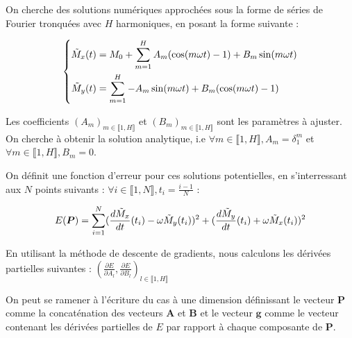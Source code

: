 \documentclass[12pt]{report}
\begin{document}
On cherche des solutions numériques approchées sous la forme de séries de Fourier tronquées avec $H$ harmoniques, en posant la forme suivante :

\begin{equation}
    \left\{
    \begin{aligned}
        \Tilde{M}_x(t) & = M_0 + \sum_{m=1}^{H} A_m (\cos(m\omega t)-1) + B_m \sin(m\omega t) \\
        \Tilde{M}_y(t) & = \sum_{m=1}^{H} -A_m \sin(m\omega t) + B_m (\cos(m\omega t)-1)
    \end{aligned}
    \right.
    \label{eq:solution_fourier_couplee_2D}
\end{equation}

Les coefficients $(A_m)_{m\in \llbracket 1,H \rrbracket}$ et $(B_m)_{m\in \llbracket 1,H \rrbracket}$ sont les paramètres à ajuster.
On cherche à obtenir la solution analytique, i.e $\forall m \in\llbracket 1,H \rrbracket, A_m = \delta _1 ^m $ et $\forall m \in\llbracket 1,H \rrbracket, B_m = 0 $.

On définit une fonction d'erreur pour ces solutions potentielles, en s'interressant aux $N$ points suivants : $\forall i \in\llbracket 1,N \rrbracket, t_i = \frac{i-1}{N} $ :

\begin{equation}
    E(\bm{P}) = \sum_{i=1}^{N} (\frac{d\Tilde{M}_x}{dt}(t_i) - \omega \Tilde{M}_y(t_i))^2 + (\frac{d\Tilde{M}_y}{dt}(t_i) + \omega \Tilde{M}_x(t_i))^2
    \label{eq:erreur_descente_gradient_couplees}
\end{equation}

En utilisant la méthode de descente de gradients, nous calculons les dérivées partielles suivantes :
$(\frac{\partial E}{\partial A_l}, \frac{\partial E}{\partial B_l})_{l \in \llbracket 1,H \rrbracket}$

On peut se ramener à l'écriture du cas à une dimension définissant le vecteur $\bm{P}$ comme la concaténation des vecteurs $\bm{A}$ et $\bm{B}$ et le vecteur $\bm{g}$ comme le vecteur contenant les dérivées partielles de $E$ par rapport à chaque composante de $\bm{P}$.
\end{document}
